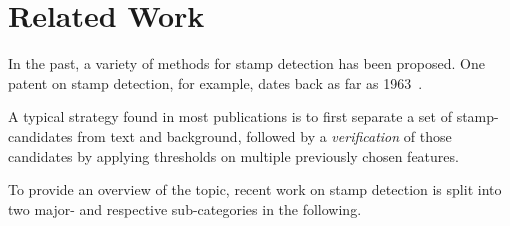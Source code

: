 \section{Related Work}\label{sect:related-work}
In the past, a variety of methods for stamp detection has been proposed.
One patent on stamp detection, for example, dates back as far as
1963~\cite{Steinbuch.1963}.

A typical strategy found in most publications is to first separate a set of
stamp-candidates from text and background, followed by a \textit{verification} of those
candidates by applying thresholds on multiple previously chosen features.

To provide an overview of the topic, recent work on stamp detection is split into
two major- and respective sub-categories in the following.

